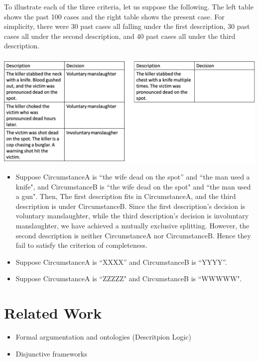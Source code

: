 \documentclass{llncs}%
\begin{document}
\begin{example} 
  To illustrate each of the three criteria, let us suppose the following. The left table shows the past 100 cases and the right table 
	shows the present case. For simplicity, there were 30 past cases all falling under the first description, 
	30 past cases all under the second description, and 40 past cases all under the third description. \\\\ 
	\includegraphics[scale=0.4]{table1.png}

	\begin{itemize} 
		\item Suppose CircumstanceA is ``the wife dead on the spot'' and ``the man used a knife", and CircumstanceB is ``the wife dead on the spot" 
			and ``the man used a gun".  Then, The first description fits in CircumstanceA, and the third description is under CircumstanceB. 
			Since the first description's decision is voluntary manslaughter, while the third description's decision is involuntary manslaughter, 
			we have achieved a mutually exclusive splitting. However, the second description is neither CircumstanceA nor CircumstanceB. 
			Hence they fail to satisfy the criterion of completeness.  
		\item Suppose CircumstanceA is ``XXXX'' and CircumstanceB is ``YYYY''. 
		\item Suppose CircumstanceA is ``ZZZZZ" and CircumstanceB is ``WWWWW".
	\end{itemize} 
	


\end{example} 




\section{Related Work}\label{sec:related}

\begin{itemize}
    \item Formal argumentation and ontologies (Descritpion Logic) \cite{ontology}
    \item Disjunctive frameworks
\end{itemize}
\end{document}
